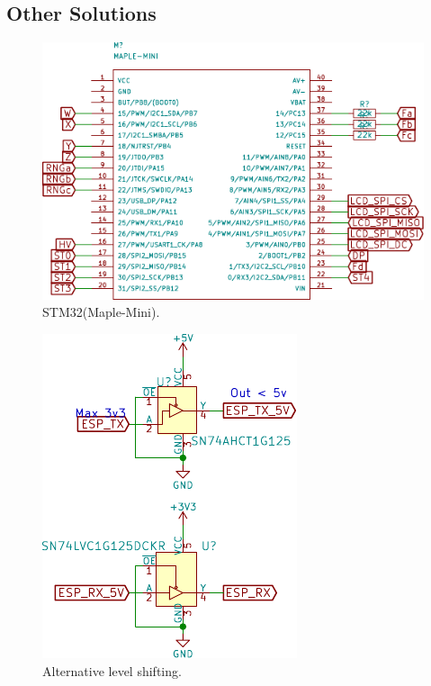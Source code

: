 \documentclass[a4paper,10pt]{article}
\begin{document}
\subsection{Other Solutions}



\begin{figure}[h!t] \centering
    \includegraphics{figures/sch-smartshow-stm32.pdf}
    \caption{STM32(Maple-Mini).} \label{fig:smartshow-stm32}
\end{figure}



\begin{figure}[h!t] \centering
    \includegraphics{figures/sch-smartshow-alt-levelshift.pdf}
    \caption{Alternative level shifting.} \label{fig:levelshiftalt}
\end{figure}
\end{document}
